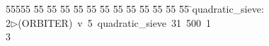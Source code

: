 %
%
\begin{tabbing}
55555 \= 55 \= 55 \= 55 \= 55 \= 55 \= 55 \= 55 \= 55 \= 55 \= 55 \= 55 \= 55 \= \>quadratic\_sieve:\\[0pt]
2\>$\triangleright$\>(ORBITER)\ v\ 5\ quadratic\_sieve\ 31\ 500\ 1\\[0pt]
3\>\end{tabbing}
